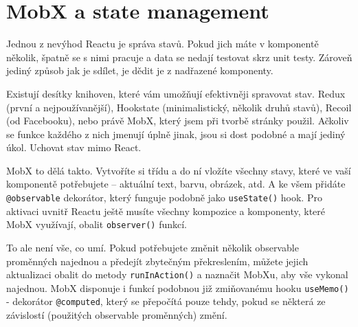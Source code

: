 \section{MobX a state management}

Jednou z nevýhod Reactu je správa stavů. Pokud jich máte v komponentě několik, špatně se s nimi pracuje a data se nedají testovat skrz unit testy. Zároveň jediný způsob jak je sdílet, je dědit je z nadřazené komponenty.

Existují desítky knihoven\cite{StateManagementLibs}, které vám umožňují efektivněji spravovat stav. Redux (první a nejpoužívanější), Hookstate (minimalistický, několik druhů stavů), Recoil (od Facebooku), nebo právě MobX, který jsem při tvorbě stránky použil. Ačkoliv se funkce každého z nich jmenují úplně jinak, jsou si dost podobné a mají jediný úkol. Uchovat stav mimo React.

MobX to dělá takto. Vytvoříte si třídu a do ní vložíte všechny stavy, které ve vaší komponentě potřebujete – aktuální text, barvu, obrázek, atd. A ke všem přidáte \texttt{@observable} dekorátor, který funguje podobně jako \texttt{useState()} hook. Pro aktivaci uvnitř Reactu ještě musíte všechny kompozice a komponenty, které MobX využívají, obalit \texttt{observer()} funkcí.

To ale není vše, co umí. Pokud potřebujete změnit několik observable proměnných najednou a předejít zbytečným překreslením, můžete jejich aktualizaci obalit do metody \texttt{runInAction()} a naznačit MobXu, aby vše vykonal najednou. MobX disponuje i funkcí podobnou již zmiňovanému hooku \texttt{useMemo()} - dekorátor \texttt{@computed}\cite{MobXComputed}, který se přepočítá pouze tehdy, pokud se některá ze závislostí (použitých observable proměnných) změní.